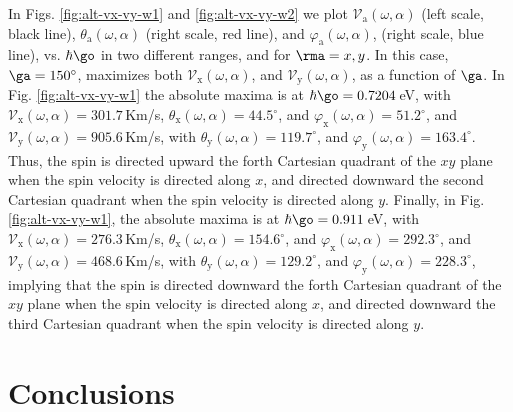 \documentclass[prb,11pt,tightenlines,twocolumn,aps]{revtex4-1}
\begin{document}
In Figs. \ref{fig:alt-vx-vy-w1} and \ref{fig:alt-vx-vy-w2} we plot
$\mathcal{V}_{\mathrm{a}} (\omega,\alpha)$ (left scale, black line),
$\theta_{\mathrm{a}} (\omega,\alpha)$ (right scale, red line), and
$\varphi_{\mathrm{a}} (\omega,\alpha)$, (right scale, blue line), vs.
$\hbar\go$ in two different ranges, and  for $\rma=x,y$. In this case,
$\ga=150^\circ$,  maximizes both $\mathcal{V}_{\mathrm{x}} (\omega,\alpha)$,
and $\mathcal{V}_{\mathrm{y}} (\omega,\alpha)$, as a function of $\ga$.
% 
In Fig. \ref{fig:alt-vx-vy-w1} the absolute maxima is at
{\color{red} $\hbar\go=0.7204$\,eV,} with $\mathcal{V}_{\mathrm{x}}
(\omega,\alpha) = 301.7$\,Km/s, $\theta_{\mathrm{x}} (\omega,\alpha) =
44.5^{\circ}$, and $\varphi_{\mathrm{x}}(\omega,\alpha) = 51.2^{\circ}$,
and $\mathcal{V}_{\mathrm{y}} (\omega,\alpha) = 905.6$\,Km/s, with
$\theta_{\mathrm{y}} (\omega,\alpha) = 119.7^{\circ}$, and
$\varphi_{\mathrm{y}}(\omega,\alpha) = 163.4^{\circ}$. 
% 
Thus, the spin is directed upward the forth Cartesian quadrant of the $xy$
plane when the spin velocity is directed along $x$, and directed downward the
second Cartesian quadrant when the spin velocity is directed along $y$.
% 
Finally, in  Fig. \ref{fig:alt-vx-vy-w1}, the absolute maxima is at
$\hbar\go=0.911$\,eV, with $\mathcal{V}_{\mathrm{x}} (\omega,\alpha) =
276.3$\,Km/s, $\theta_{\mathrm{x}} (\omega,\alpha) = 154.6^{\circ}$, and
$\varphi_{\mathrm{x}}(\omega,\alpha) = 292.3^{\circ}$, and
$\mathcal{V}_{\mathrm{y}} (\omega,\alpha) = 468.6$\,Km/s, with
$\theta_{\mathrm{y}} (\omega,\alpha) = 129.2^{\circ}$, and
$\varphi_{\mathrm{y}}(\omega,\alpha) = 228.3^{\circ}$, implying that the spin
is directed downward the forth Cartesian quadrant of the $xy$ plane when the
spin velocity is directed along $x$, and directed downward the third Cartesian
quadrant when the spin velocity is directed along $y$.

\section{Conclusions} %
\label{sec:conclusions}
\end{document}
